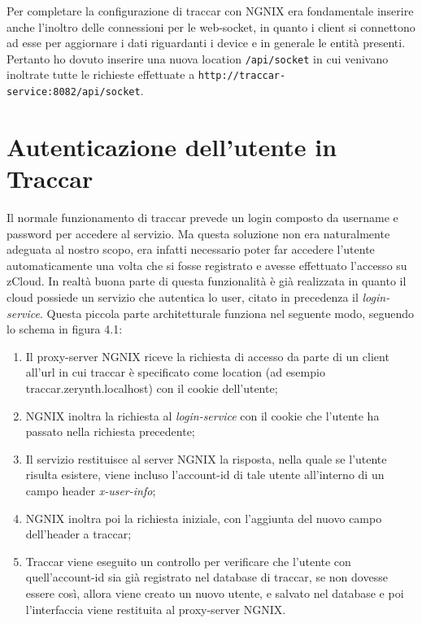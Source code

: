 \documentclass[a4paper,titlepage,12pt]{book}
\begin{document}
Per completare la configurazione di traccar con NGNIX era fondamentale inserire anche l'inoltro delle connessioni per le web-socket, in quanto i client si connettono ad esse per aggiornare i dati riguardanti i device e in generale le entità presenti. Pertanto ho dovuto inserire una nuova location \texttt{/api/socket} in cui venivano inoltrate tutte le richieste effettuate a \texttt{http://traccar-service:8082/api/socket}.


\section{\sffamily
Autenticazione dell'utente in Traccar}
Il normale funzionamento di traccar prevede un login composto da username e password per accedere al servizio. Ma questa soluzione non era naturalmente adeguata al nostro scopo, era infatti necessario poter far accedere l'utente automaticamente una volta che si fosse registrato e avesse effettuato l'accesso su zCloud. In realtà buona parte di questa funzionalità è già realizzata in quanto il cloud possiede un servizio che autentica lo user, citato in precedenza il \textit{login-service}. Questa piccola parte architetturale funziona nel seguente modo, seguendo lo schema in figura 4.1:\\
\begin{enumerate}
\item Il proxy-server NGNIX riceve la richiesta di accesso da parte di un client all'url in cui traccar è specificato come location (ad esempio traccar.zerynth.localhost) con il cookie dell'utente;
\item NGNIX inoltra la richiesta al \textit{login-service} con il cookie che l'utente ha passato nella richiesta precedente;
\item Il servizio restituisce al server NGNIX la risposta, nella quale se l'utente risulta esistere, viene incluso l'account-id di tale utente all'interno di un campo header \textit{x-user-info};
\item NGNIX inoltra poi la richiesta iniziale, con l'aggiunta del nuovo campo dell'header a traccar;

\item Traccar viene eseguito un controllo per verificare che l'utente con quell'account-id sia già registrato nel database di traccar, se non dovesse essere così, allora viene creato un nuovo utente, e salvato nel database e poi l'interfaccia viene restituita al proxy-server NGNIX.
\end{enumerate}
\end{document}
